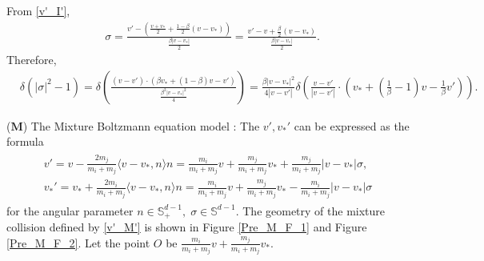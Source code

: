 \documentclass[reqno,10pt]{amsart}
\numberwithin{equation}{section}
\begin{document}
From \eqref{v'_I'}, 
\begin{align} \label{sigma_I}
     &{\sigma}=\frac{v'-(\frac{v+v_*}{2}+\frac{1-\beta}{2}(v-v_*))}{\frac{\beta|v-v_*|}{2}}=\frac{v'-v+\frac{\beta}{2}(v-v_*)}{\frac{\beta|v-v_*|}{2}}.
\end{align} Therefore, 
\begin{align} \label{delta_I}
     &\delta(|\sigma|^2-1)
    = \delta(\frac{(v-v')\cdot(\beta v_*+(1-\beta)v-v')}{\frac{\beta^2|v-v_*|^2}{4}})
    =\frac{\beta|v-v_*|^2}{4|v-v'|}\delta(\frac{v-v'}{|v-v'|}\cdot (v_*+(\frac{1}{\beta}-1)v-\frac{1}{\beta}v')).
\end{align} \vspace{7mm}

\noindent ($\mathbf{M}$) The Mixture Boltzmann equation model : The $v',v_*'$ can be expressed as the formula
\begin{align} \label{v'_M'}
\begin{split}
     v' =v-\frac{2m_j}{m_i+m_j}\langle v-v_*, n \rangle {n}= \frac{m_i}{m_i+m_j}v+\frac{m_j}{m_i+m_j}v_*+\frac{m_j}{m_i+m_j}|v-v_*|
    \sigma,\\
    v_*' =v_*+\frac{2m_i}{m_i+m_j}\langle v-v_*, n \rangle {n}=\frac{m_i}{m_i+m_j}v+\frac{m_j}{m_i+m_j}v_*-\frac{m_i}{m_i+m_j}|v-v_*|\sigma
\end{split}
\end{align}
for the angular parameter ${n} \in \mathbb{S}^{d-1}_{+}, \; {\sigma} \in \mathbb{S}^{d-1}.$ The geometry of the mixture collision defined by \eqref{v'_M'} is shown in Figure \ref{Pre_M_F_1} and Figure \ref{Pre_M_F_2}. Let the point $O$ be $\frac{m_i}{m_i+m_j}v+\frac{m_j}{m_i+m_j}v_*$.\vspace{3mm}
\end{document}
